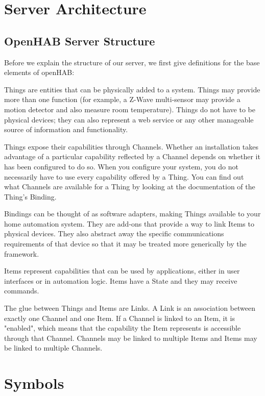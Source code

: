\section{Server Architecture}
\subsection{OpenHAB Server Structure}

Before we explain the structure of our server, we first give definitions for the base elements of openHAB:

Things are entities that can be physically added to a system. Things may provide more than one function (for example, a Z-Wave multi-sensor may provide a motion detector and also measure room temperature). Things do not have to be physical devices; they can also represent a web service or any other manageable source of information and functionality.

Things expose their capabilities through Channels. Whether an installation takes advantage of a particular capability reflected by a Channel depends on whether it has been configured to do so. When you configure your system, you do not necessarily have to use every capability offered by a Thing. You can find out what Channels are available for a Thing by looking at the documentation of the Thing's Binding.

Bindings can be thought of as software adapters, making Things available to your home automation system. They are add-ons that provide a way to link Items to physical devices. They also abstract away the specific communications requirements of that device so that it may be treated more generically by the framework.

Items represent capabilities that can be used by applications, either in user interfaces or in automation logic. Items have a State and they may receive commands.

The glue between Things and Items are Links. A Link is an association between exactly one Channel and one Item. If a Channel is linked to an Item, it is "enabled", which means that the capability the Item represents is accessible through that Channel. Channels may be linked to multiple Items and Items may be linked to multiple Channels.



\section{Symbols}

